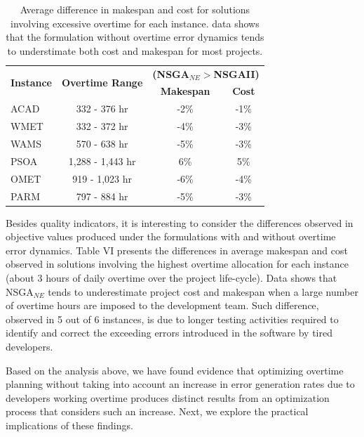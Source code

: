 \documentclass[conference]{IEEEtran}
\begin{document}
\begin{table}[htbp]
	\scriptsize
  \centering
  \caption{Average difference in makespan and cost for solutions involving excessive overtime for each instance. data shows that the formulation without overtime error dynamics tends to understimate both cost and makespan for most projects.}
    \begin{tabular}{rccc}
    \toprule
    \multicolumn{1}{c}{\multirow{2}[2]{*}{\textbf{Instance}}} & \multirow{2}[2]{*}{\textbf{Overtime  Range}} & \multicolumn{2}{c}{\textbf{(NSGA$_{NE}>$NSGAII)}} \\

    \multicolumn{1}{c}{} &       & \textbf{Makespan } & \textbf{Cost} \\
        \midrule
    \multicolumn{1}{l}{ACAD} & 332 - 376 hr & -2\%  & -1\% \\
    \multicolumn{1}{l}{WMET} & 332 - 372 hr & -4\%  & -3\% \\
    \multicolumn{1}{l}{WAMS} & 570 - 638 hr & -5\%  & -3\% \\
    \multicolumn{1}{l}{PSOA} & 1,288 - 1,443 hr & 6\%   & 5\% \\
    \multicolumn{1}{l}{OMET} & 919 - 1,023 hr & -6\%  & -4\% \\
    \multicolumn{1}{l}{PARM} & 797 - 884 hr & -5\%  & -3\% \\
    \bottomrule
    \end{tabular}%
\end{table}%

Besides quality indicators, it is interesting to consider the differences observed in objective values produced under the formulations with and without overtime error dynamics. Table VI presents the differences in average makespan and cost observed in solutions involving the highest overtime allocation for each instance (about 3 hours of daily overtime over the project life-cycle). Data shows that NSGA$_{NE}$ tends to underestimate project cost and makespan when a large number of overtime hours are imposed to the development team. Such difference, observed in 5 out of 6 instances, is due to longer testing activities required to identify and correct the exceeding errors introduced in the software by tired developers.

Based on the analysis above, we have found evidence that optimizing overtime planning without taking into account an increase in error generation rates due to developers working overtime produces distinct results from an optimization process that considers such an increase. Next, we explore the practical implications of these findings.
\end{document}
